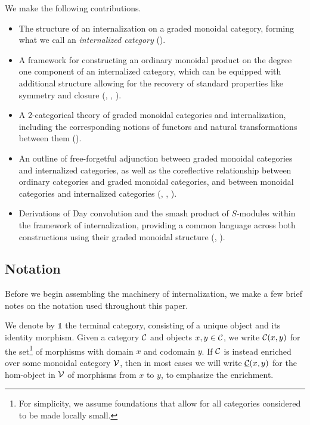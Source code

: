 \documentclass[openany, amssymb, psamsfonts]{amsart}
\theoremstyle{definition}
\numberwithin{equation}{section}
\begin{document}
We make the following contributions.
\begin{itemize}[label=\textendash, noitemsep, topsep=2pt]
    \item The structure of an internalization on a graded monoidal category, forming what we call an \emph{internalized category} ().
    \item A framework for constructing an ordinary monoidal product on the degree one component of an internalized category, which can be equipped with additional structure allowing for the recovery of standard properties like symmetry and closure (, , ).
    \item A 2-categorical theory of graded monoidal categories and internalization, including the corresponding notions of functors and natural transformations between them ().
    \item An outline of free-forgetful adjunction between graded monoidal categories and internalized categories, as well as the coreflective relationship between ordinary categories and graded monoidal categories, and between monoidal categories and internalized categories (, , ).
    \item Derivations of Day convolution and the smash product of $S$-modules within the framework of internalization, providing a common language across both constructions using their graded monoidal structure (, ).
\end{itemize}

\subsection{Notation}
\label{subsection:notation}

Before we begin assembling the machinery of internalization, we make a few brief notes on the notation used throughout this paper. 

We denote by $\mathbb{1}$ the terminal category, consisting of a unique object and its identity morphism. Given a category $\mathcal{C}$ and objects $x, y \in \mathcal{C}$, we write $\mathcal{C}(x, y)$ for the set\footnote{For simplicity, we assume foundations that allow for all categories considered to be made locally small.} of morphisms with domain $x$ and codomain $y$. If $\mathcal{C}$ is instead enriched over some monoidal category $\mathcal{V}$, then in most cases we will write $\underline{\mathcal{C}}(x, y)$ for the hom-object in $\mathcal{V}$ of morphisms from $x$ to $y$, to emphasize the enrichment.
\end{document}
